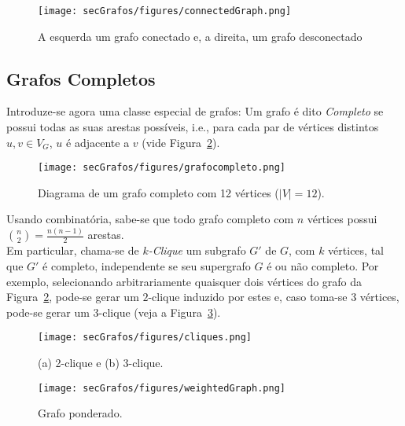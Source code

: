 \begin{figure}[H]
	\begin{center}
		\texttt{[image: secGrafos/figures/connectedGraph.png]}
	\end{center}
	\caption{A esquerda um grafo conectado e, a direita, um grafo desconectado}
	\label{fig:connectGraph}
\end{figure}

\subsection{Grafos Completos}

Introduze-se agora uma classe especial de grafos: Um grafo é dito \textit{Completo} se possui todas as suas arestas possíveis, i.e., para cada par de vértices distintos $u, v \in V_G$, $u$ é adjacente a $v$ (vide Figura~\ref{fig:grafocompleto}).

\begin{figure}[H]
	\begin{center}
		\texttt{[image: secGrafos/figures/grafocompleto.png]}
	\end{center}
	\caption{Diagrama de um grafo completo com 12 vértices ($|V| = 12$).}
	\label{fig:grafocompleto}
\end{figure}

Usando combinatória, sabe-se que todo grafo completo com $n$ vértices possui ${n \choose 2}=\frac{n(n-1)}{2}$ arestas.
\\

Em particular, chama-se de \textit{$k$-Clique} um subgrafo $G'$ de $G$, com $k$ vértices, tal que $G'$ é completo, independente se seu supergrafo $G$ é ou não completo. Por exemplo, selecionando arbitrariamente quaisquer dois vértices do grafo da Figura~\ref{fig:grafocompleto}, pode-se gerar um $2$-clique induzido por estes e, caso toma-se 3 vértices, pode-se gerar um $3$-clique (veja a Figura~\ref{fig:cliques}).

\begin{minipage}{0.55 \linewidth}
	\begin{figure}[H]
		\begin{center}
			\texttt{[image: secGrafos/figures/cliques.png]}
		\end{center}
		\caption{(a) 2-clique e (b) 3-clique.}
		\label{fig:cliques}
	\end{figure}
\end{minipage}
\hspace{0.1cm}
\begin{minipage}{0.40 \linewidth}
	\begin{figure}[H]
		\begin{center}
			\texttt{[image: secGrafos/figures/weightedGraph.png]}
		\end{center}
		\caption{Grafo ponderado.}
		\label{fig:weightedGraph}
	\end{figure}
\end{minipage}

